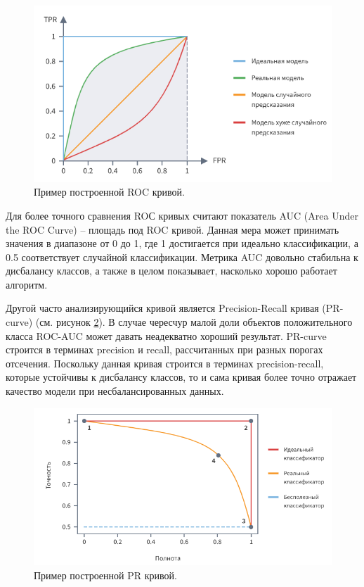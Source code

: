 \documentclass[a4paper,12pt]{extarticle}
\begin{document}
\begin{figure}[ht]
	\centering
	\includegraphics[scale=0.8]{roccurve.png}
	\caption{Пример построенной ROC кривой. \cite{https://loginom.ru/blog/classification-quality}}
	\label{fig:roccurve}
\end{figure}

Для более точного сравнения ROС кривых считают показатель AUC (Area Under the ROC Curve) – площадь под ROC кривой. Данная мера может принимать значения в диапазоне от 0 до 1, где 1 достигается при идеально классификации, а 0.5 соответствует случайной классификации. Метрика AUC довольно стабильна к дисбалансу классов, а также в целом показывает, насколько хорошо работает алгоритм.

Другой часто анализирующийся кривой является Precision-Recall кривая (PR-curve) (см. рисунок \ref{fig:prcurve}). В случае чересчур малой доли объектов положительного класса ROC-AUC может давать неадекватно хороший результат. PR-curve строится в терминах precision и recall, рассчитанных при разных порогах отсечения. Поскольку данная кривая строится в терминах precision-recall, которые устойчивы к дисбалансу классов, то и сама кривая более точно отражает качество модели при несбалансированных данных.

\begin{figure}[ht]
	\centering
	\includegraphics[scale=0.8]{prcurve.png}
	\caption{Пример построенной PR кривой. \cite{https://loginom.ru/blog/classification-quality}}
	\label{fig:prcurve}
\end{figure}
\end{document}
